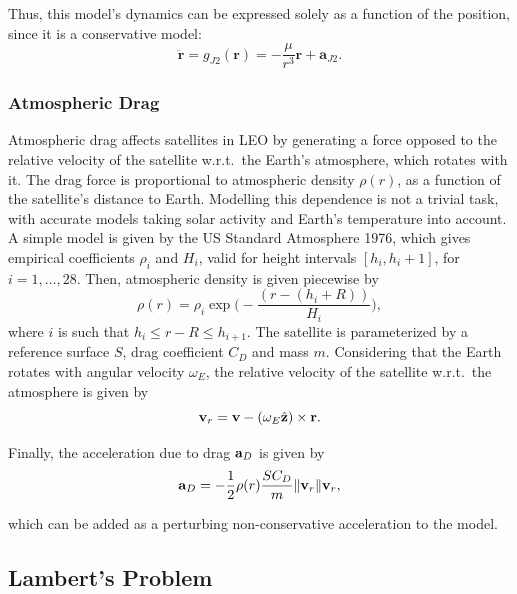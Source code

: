 Thus, this model's dynamics can be expressed solely as a function of the position, since it is a conservative model:
\begin{equation}\label{eq:j2_dyn}
    \ddot{\mathbf{r}} = g_{J2}(\mathbf{r}) = -\frac{\mu}{r^3} \mathbf{r} + \mathbf{a}_{J2}.
\end{equation}

\subsubsection{Atmospheric Drag}\label{sssec:drag}

Atmospheric drag affects satellites in LEO by generating a force opposed to the relative velocity of the satellite w.r.t.\ the Earth's atmosphere, which rotates with it. The drag force is proportional to atmospheric density \(\rho(r)\), as a function of the satellite's distance to Earth. Modelling this dependence is not a trivial task, with accurate models taking solar activity and Earth's temperature into account. A simple model is given by the US Standard Atmosphere 1976, which gives empirical coefficients \(\rho_i\) and \(H_i\), valid for height intervals \([h_i, h_i+1]\), for \(i = 1,\dots, 28\). Then, atmospheric density is given piecewise by
\begin{equation}\label{eq:rho}
    \rho(r) = \rho_i \exp{\big(-\frac{\left(r - (h_i + R)\right)}{H_i}\big)},
\end{equation}
where \(i\) is such that \(h_i \leq r - R \leq h_{i+1}\). The satellite is parameterized by a reference surface \(S\), drag coefficient \(C_D\) and mass \(m\). Considering that the Earth rotates with angular velocity \(\omega_E\), the relative velocity of the satellite w.r.t.\ the atmosphere is given by
\begin{equation}
    \mathbf{v}_{r} = \mathbf{v} - (\omega_E \hat{\mathbf{z}}) \times \mathbf{r}.
\end{equation}

Finally, the acceleration due to drag \(\mathbf{a}_D\) is given by
\begin{equation}\label{eq:acc_drag}
    \acc_D = - \frac{1}{2} \rho(r) \frac{S C_D}{m} \lVert \vel_r \rVert \vel_r,
\end{equation}

which can be added as a perturbing non-conservative acceleration to the model.

\subsection{Lambert's Problem}

